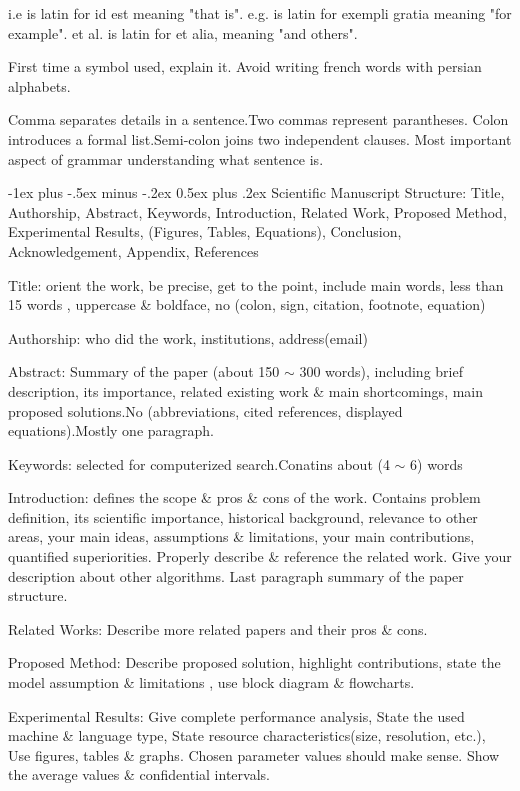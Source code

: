 \documentclass[10pt,landscape]{article}
\makeatletter
\renewcommand{\section}{\@startsection{section}{1}{0mm}%
                                {-1ex plus -.5ex minus -.2ex}%
                                {0.5ex plus .2ex}%
                                {\normalfont\large\bfseries}}
\makeatother
\begin{document}
\begin{multicols*}{3}
i.e is latin for id est meaning "that is". e.g. is latin for exempli gratia meaning "for example".
et al. is latin for et alia, meaning "and others".

First time a symbol used, explain it.
Avoid writing french words with persian alphabets.

Comma separates details in a sentence.Two commas represent parantheses.
Colon introduces a formal list.Semi-colon joins two independent clauses.
Most important aspect of grammar understanding what sentence is.

\section{Scientific Manuscript}
Structure: Title, Authorship, Abstract, Keywords, Introduction, Related Work, Proposed Method,
Experimental Results, (Figures, Tables, Equations), Conclusion, Acknowledgement, Appendix, References

Title: orient the work, be precise, get to the point, include main words, less than 15 words
, uppercase \& boldface, no (colon, sign, citation, footnote, equation)

Authorship: who did the work, institutions, address(email)

Abstract: Summary of the paper (about 150 $\sim$ 300 words),
including brief description, its importance, related existing work \& main shortcomings, main
proposed solutions.No (abbreviations, cited references, displayed equations).Mostly one paragraph.

Keywords: selected for computerized search.Conatins about (4 $\sim$ 6) words

Introduction: defines the scope \& pros \& cons of the work.
Contains problem definition, its scientific importance, historical background, relevance to other areas,
your main ideas, assumptions \& limitations, your main contributions, quantified superiorities.
Properly describe \& reference the related work. Give your description about other algorithms.
Last paragraph summary of the paper structure.

Related Works: Describe more related papers and their pros \& cons.

Proposed Method: Describe proposed solution, highlight contributions, state the model assumption \& limitations
, use block diagram \& flowcharts.

Experimental Results: Give complete performance analysis, State the used machine \& language type,
State resource characteristics(size, resolution, etc.), Use figures, tables \& graphs.
Chosen parameter values should make sense. Show the average values \& confidential intervals.


\end{multicols*}
\end{document}
